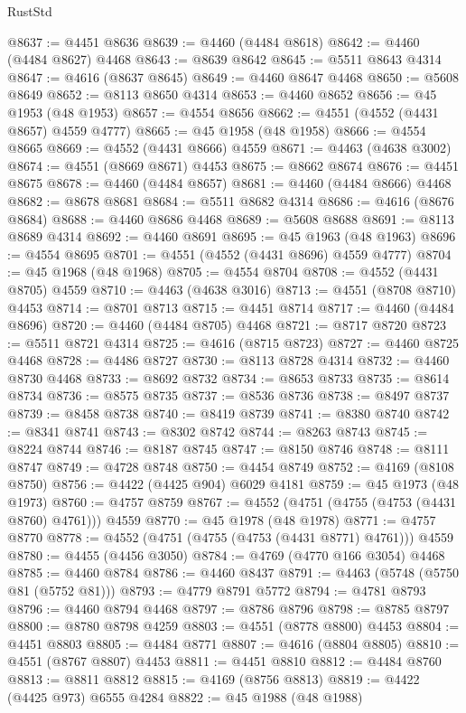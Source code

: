 \begin{lexlean}{RustStd}
\begin{coremodule}
@8637 := @4451 @8636
@8639 := @4460 (@4484 @8618)
@8642 := @4460 (@4484 @8627) @4468
@8643 := @8639 @8642
@8645 := @5511 @8643 @4314
@8647 := @4616 (@8637 @8645)
@8649 := @4460 @8647 @4468
@8650 := @5608 @8649
@8652 := @8113 @8650 @4314
@8653 := @4460 @8652
@8656 := @45 @1953 (@48 @1953)
@8657 := @4554 @8656
@8662 := @4551 (@4552 (@4431 @8657) @4559 @4777)
@8665 := @45 @1958 (@48 @1958)
@8666 := @4554 @8665
@8669 := @4552 (@4431 @8666) @4559
@8671 := @4463 (@4638 @3002)
@8674 := @4551 (@8669 @8671) @4453
@8675 := @8662 @8674
@8676 := @4451 @8675
@8678 := @4460 (@4484 @8657)
@8681 := @4460 (@4484 @8666) @4468
@8682 := @8678 @8681
@8684 := @5511 @8682 @4314
@8686 := @4616 (@8676 @8684)
@8688 := @4460 @8686 @4468
@8689 := @5608 @8688
@8691 := @8113 @8689 @4314
@8692 := @4460 @8691
@8695 := @45 @1963 (@48 @1963)
@8696 := @4554 @8695
@8701 := @4551 (@4552 (@4431 @8696) @4559 @4777)
@8704 := @45 @1968 (@48 @1968)
@8705 := @4554 @8704
@8708 := @4552 (@4431 @8705) @4559
@8710 := @4463 (@4638 @3016)
@8713 := @4551 (@8708 @8710) @4453
@8714 := @8701 @8713
@8715 := @4451 @8714
@8717 := @4460 (@4484 @8696)
@8720 := @4460 (@4484 @8705) @4468
@8721 := @8717 @8720
@8723 := @5511 @8721 @4314
@8725 := @4616 (@8715 @8723)
@8727 := @4460 @8725 @4468
@8728 := @4486 @8727
@8730 := @8113 @8728 @4314
@8732 := @4460 @8730 @4468
@8733 := @8692 @8732
@8734 := @8653 @8733
@8735 := @8614 @8734
@8736 := @8575 @8735
@8737 := @8536 @8736
@8738 := @8497 @8737
@8739 := @8458 @8738
@8740 := @8419 @8739
@8741 := @8380 @8740
@8742 := @8341 @8741
@8743 := @8302 @8742
@8744 := @8263 @8743
@8745 := @8224 @8744
@8746 := @8187 @8745
@8747 := @8150 @8746
@8748 := @8111 @8747
@8749 := @4728 @8748
@8750 := @4454 @8749
@8752 := @4169 (@8108 @8750)
@8756 := @4422 (@4425 @904) @6029 @4181
@8759 := @45 @1973 (@48 @1973)
@8760 := @4757 @8759
@8767 := @4552 (@4751 (@4755 (@4753 (@4431 @8760) @4761))) @4559
@8770 := @45 @1978 (@48 @1978)
@8771 := @4757 @8770
@8778 := @4552 (@4751 (@4755 (@4753 (@4431 @8771) @4761))) @4559
@8780 := @4455 (@4456 @3050)
@8784 := @4769 (@4770 @166 @3054) @4468
@8785 := @4460 @8784
@8786 := @4460 @8437
@8791 := @4463 (@5748 (@5750 @81 (@5752 @81)))
@8793 := @4779 @8791 @5772
@8794 := @4781 @8793
@8796 := @4460 @8794 @4468
@8797 := @8786 @8796
@8798 := @8785 @8797
@8800 := @8780 @8798 @4259
@8803 := @4551 (@8778 @8800) @4453
@8804 := @4451 @8803
@8805 := @4484 @8771
@8807 := @4616 (@8804 @8805)
@8810 := @4551 (@8767 @8807) @4453
@8811 := @4451 @8810
@8812 := @4484 @8760
@8813 := @8811 @8812
@8815 := @4169 (@8756 @8813)
@8819 := @4422 (@4425 @973) @6555 @4284
@8822 := @45 @1988 (@48 @1988)

\end{coremodule}
\end{lexlean}
